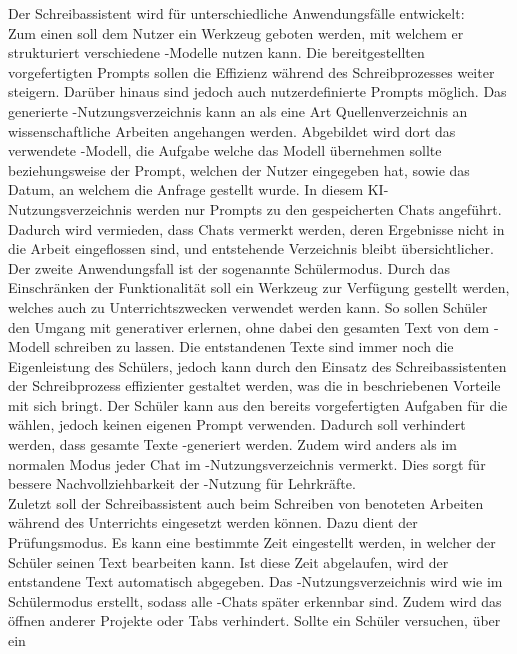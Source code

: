 \documentclass[../main.tex]{subfiles}
\begin{document}
Der Schreibassistent wird für unterschiedliche Anwendungsfälle entwickelt: \\
Zum einen soll dem Nutzer ein Werkzeug geboten werden, mit welchem er strukturiert verschiedene -Modelle nutzen kann. Die bereitgestellten vorgefertigten Prompts sollen die 
Effizienz während des Schreibprozesses weiter steigern. Darüber hinaus sind jedoch auch nutzerdefinierte Prompts möglich. Das generierte -Nutzungsverzeichnis kann an als eine Art 
Quellenverzeichnis an wissenschaftliche Arbeiten angehangen werden. Abgebildet wird dort das verwendete -Modell, die Aufgabe welche das Modell 
übernehmen sollte beziehungsweise der Prompt, welchen der Nutzer eingegeben hat, sowie das Datum, an welchem die Anfrage gestellt wurde. In diesem KI-Nutzungsverzeichnis werden nur 
Prompts zu den gespeicherten Chats angeführt. Dadurch wird vermieden, dass Chats vermerkt werden, deren Ergebnisse nicht in die Arbeit eingeflossen sind, und entstehende Verzeichnis 
bleibt übersichtlicher.\\ 
Der zweite Anwendungsfall ist der sogenannte Schülermodus. Durch das Einschränken der Funktionalität soll ein Werkzeug zur Verfügung gestellt werden, welches auch zu 
Unterrichtszwecken verwendet werden kann. So sollen Schüler den Umgang mit generativer  erlernen, ohne dabei den gesamten Text von dem -Modell schreiben zu lassen. Die 
entstandenen Texte sind immer noch die Eigenleistung des Schülers, jedoch kann durch den Einsatz des Schreibassistenten der Schreibprozess effizienter gestaltet werden, was die in 
 beschriebenen Vorteile mit sich bringt. Der Schüler kann aus den bereits vorgefertigten Aufgaben für die  wählen, jedoch keinen eigenen Prompt verwenden. Dadurch soll 
verhindert werden, dass gesamte Texte -generiert werden. Zudem wird anders als im normalen Modus jeder Chat im -Nutzungsverzeichnis vermerkt. Dies sorgt für bessere 
Nachvollziehbarkeit der -Nutzung für Lehrkräfte.\\ 
Zuletzt soll der Schreibassistent auch beim Schreiben von benoteten Arbeiten während des Unterrichts eingesetzt werden können. Dazu dient der Prüfungsmodus. Es kann eine bestimmte 
Zeit eingestellt werden, in welcher der Schüler seinen Text bearbeiten kann. Ist diese Zeit abgelaufen, wird der entstandene Text automatisch abgegeben. Das -Nutzungsverzeichnis 
wird wie im Schülermodus erstellt, sodass alle -Chats später erkennbar sind. Zudem wird das öffnen anderer Projekte oder Tabs verhindert. Sollte ein Schüler versuchen, über ein 
\end{document}
